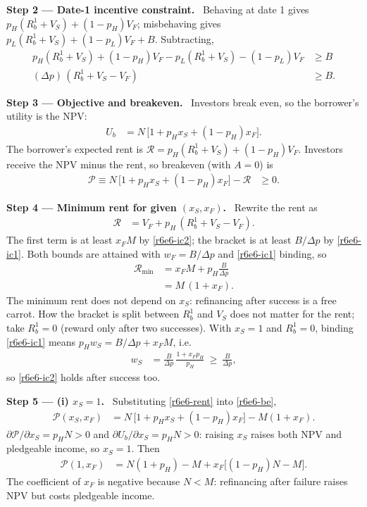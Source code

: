 \documentclass[11pt,a4paper]{article}
\newcommand{\step}[2]{\par\medskip\noindent\textbf{Step #1 --- #2.}~}
\begin{document}
\step{2}{Date-1 incentive constraint} Behaving at date 1 gives $p_H(R_b^1+V_S)+(1-p_H)V_F$; misbehaving gives $p_L(R_b^1+V_S)+(1-p_L)V_F+B$. Subtracting,
\begin{align}
  p_H(R_b^1+V_S)+(1-p_H)V_F - p_L(R_b^1+V_S)-(1-p_L)V_F &\ge B \nonumber\\
  (\Delta p)\,(R_b^1+V_S-V_F) &\ge B. \label{r6e6-ic1}
\end{align}

\step{3}{Objective and breakeven} Investors break even, so the borrower's utility is the NPV:
\begin{align}
  U_b &= N\,\big[1+p_Hx_S+(1-p_H)x_F\big]. \label{r6e6-npv}
\end{align}
The borrower's expected rent is $\mathcal R=p_H(R_b^1+V_S)+(1-p_H)V_F$. Investors receive the NPV minus the rent, so breakeven (with $A=0$) is
\begin{align}
  \mathcal P \equiv N\,\big[1+p_Hx_S+(1-p_H)x_F\big] - \mathcal R &\ge 0. \label{r6e6-be}
\end{align}

\step{4}{Minimum rent for given $(x_S,x_F)$} Rewrite the rent as
\begin{align}
  \mathcal R &= V_F + p_H\,(R_b^1+V_S-V_F). \nonumber
\end{align}
The first term is at least $x_FM$ by \eqref{r6e6-ic2}; the bracket is at least $B/\Delta p$ by \eqref{r6e6-ic1}. Both bounds are attained with $w_F=B/\Delta p$ and \eqref{r6e6-ic1} binding, so
\begin{align}
  \mathcal R_{\min} &= x_FM + p_H\frac{B}{\Delta p} \nonumber\\
                    &= M\,(1+x_F). \label{r6e6-rent}
\end{align}
The minimum rent does not depend on $x_S$: refinancing after success is a free carrot. How the bracket is split between $R_b^1$ and $V_S$ does not matter for the rent; take $R_b^1=0$ (reward only after two successes). With $x_S=1$ and $R_b^1=0$, binding \eqref{r6e6-ic1} means $p_Hw_S=B/\Delta p+x_FM$, i.e.
\begin{align}
  w_S &= \frac{B}{\Delta p}\,\frac{1+x_Fp_H}{p_H}\ \ge\ \frac{B}{\Delta p}, \label{r6e6-wS}
\end{align}
so \eqref{r6e6-ic2} holds after success too.

\step{5}{(i) $x_S=1$} Substituting \eqref{r6e6-rent} into \eqref{r6e6-be},
\begin{align}
  \mathcal P(x_S,x_F) &= N\,\big[1+p_Hx_S+(1-p_H)x_F\big] - M(1+x_F). \label{r6e6-P}
\end{align}
$\partial\mathcal P/\partial x_S=p_HN>0$ and $\partial U_b/\partial x_S=p_HN>0$: raising $x_S$ raises both NPV and pledgeable income, so $x_S=1$. Then
\begin{align}
  \mathcal P(1,x_F) &= N(1+p_H) - M + x_F\big[(1-p_H)N-M\big]. \label{r6e6-P1}
\end{align}
The coefficient of $x_F$ is negative because $N<M$: refinancing after failure raises NPV but costs pledgeable income.
\end{document}
